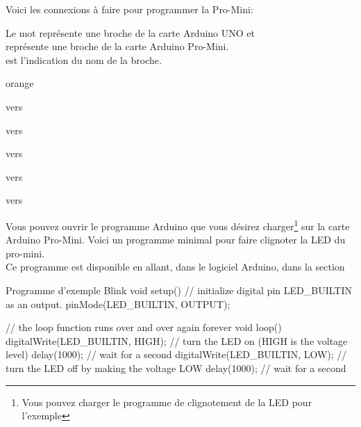   
  Voici les connexions à faire pour programmer la Pro-Mini: 

  Le mot  représente une broche de la carte Arduino UNO et \\ 
   représente une broche de la carte Arduino Pro-Mini.\\
   est l'indication du nom de la broche.

  \begin{items}{orange}{\Triangle}
    \item {} vers 
    \item {} vers 
    \item {} vers 
    \item {} vers 
    \item {} vers 
  \end{items}


 




  Vous pouvez ouvrir le programme Arduino que vous désirez charger\footnote{Vous pouvez charger le programme de clignotement de la LED pour l'exemple} sur la carte Arduino Pro-Mini.
  Voici un programme minimal pour faire clignoter la LED du pro-mini. \\
  Ce programme est disponible en allant, dans le logiciel Arduino, dans la section \\
  
  \begin{Cpp}{Programme d'exemple Blink}
  void setup() {
  // initialize digital pin LED_BUILTIN as an output.
  pinMode(LED_BUILTIN, OUTPUT);
}

// the loop function runs over and over again forever
void loop() {
  digitalWrite(LED_BUILTIN, HIGH);   // turn the LED on (HIGH is the voltage level)
  delay(1000);                       // wait for a second
  digitalWrite(LED_BUILTIN, LOW);    // turn the LED off by making the voltage LOW
  delay(1000);                       // wait for a second
}
  \end{Cpp}
  
